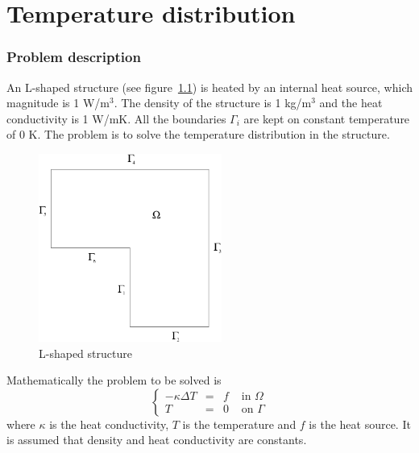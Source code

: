 \chapter{Temperature distribution} %


\subsection*{Problem description}

An L-shaped structure (see figure~\ref{fg:struct1}) is heated by an
internal heat source, which magnitude is 1 W/m$^3$. The density of the
structure is 1 kg/m$^3$ and the heat conductivity is 1 W/mK. All the
boundaries $\Gamma_i$ are kept on constant temperature of 0 K. The
problem is to solve the temperature distribution in the structure.

\begin{figure}
\begin{center}
\includegraphics[width=60mm]{Area1}
\caption{L-shaped structure}\label{fg:struct1}
\end{center}
\end{figure}

Mathematically the problem to be solved is
\begin{equation}
\left \{
\begin{array}{cccc}
- \kappa \Delta T &= &f & \mbox{ in } \Omega \\
T&=&0 & \mbox{ on } \Gamma
\end{array}
\right .
\end{equation}
where $\kappa$ is the heat conductivity, $T$  is the temperature 
and $f$ is the heat source. It is assumed that density 
and heat conductivity are constants. 


